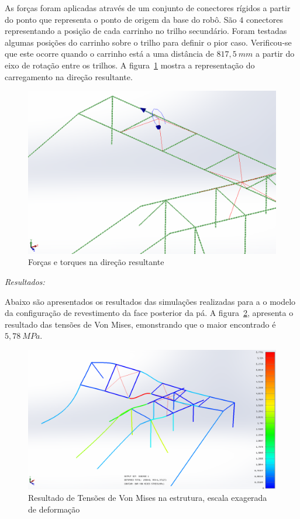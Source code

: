 As forças foram aplicadas através de um conjunto de conectores rígidos a partir
do ponto que representa o ponto de origem da base do robô. São $4$ conectores
representando a posição de cada carrinho no trilho secundário. Foram testadas
algumas posições do carrinho sobre o trilho para definir o pior caso.
Verificou-se que este ocorre quando o carrinho está a uma distância de
$817,5~mm$ a partir do eixo de rotação entre os trilhos. 
A figura~\ref{fig::carregamento} mostra a representação do carregamento na
direção resultante.

\begin{figure}[h!]
	\centering
	\includegraphics[width=0.9\columnwidth]{method/figs/dimensionamento/carregamento}
	\caption{Forças e torques na direção resultante}
    \label{fig::carregamento}
\end{figure}


\textit{Resultados:}

Abaixo são apresentados os resultados das simulações realizadas para a o modelo
da configuração de revestimento da face posterior da pá. 
A figura~\ref{fig::von_mises}, apresenta o resultado das tensões de Von Mises, 
emonstrando que o maior encontrado é $5,78~MPa$.

\begin{figure}[h!]
	\centering
	\includegraphics[width=0.9\columnwidth]{method/figs/dimensionamento/von_mises}
	\caption{Resultado de Tensões de Von Mises na estrutura, escala exagerada de
	deformação}
    \label{fig::von_mises}
\end{figure}

